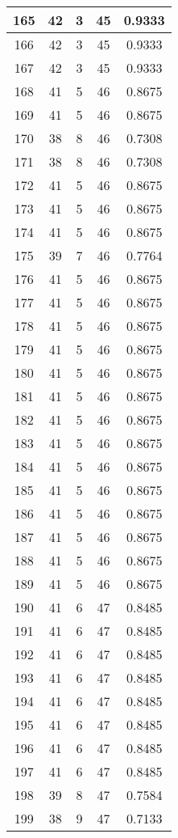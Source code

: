 \documentclass[letterpaper, 12pt]{article}
\begin{document}
\begin{longtable}{|c|c|c|c|c|}
165 & 42 & 3 & 45 & 0.9333 \\
\hline
166 & 42 & 3 & 45 & 0.9333 \\
\hline
167 & 42 & 3 & 45 & 0.9333 \\
\hline
168 & 41 & 5 & 46 & 0.8675 \\
\hline
169 & 41 & 5 & 46 & 0.8675 \\
\hline
170 & 38 & 8 & 46 & 0.7308 \\
\hline
171 & 38 & 8 & 46 & 0.7308 \\
\hline
172 & 41 & 5 & 46 & 0.8675 \\
\hline
173 & 41 & 5 & 46 & 0.8675 \\
\hline
174 & 41 & 5 & 46 & 0.8675 \\
\hline
175 & 39 & 7 & 46 & 0.7764 \\
\hline
176 & 41 & 5 & 46 & 0.8675 \\
\hline
177 & 41 & 5 & 46 & 0.8675 \\
\hline
178 & 41 & 5 & 46 & 0.8675 \\
\hline
179 & 41 & 5 & 46 & 0.8675 \\
\hline
180 & 41 & 5 & 46 & 0.8675 \\
\hline
181 & 41 & 5 & 46 & 0.8675 \\
\hline
182 & 41 & 5 & 46 & 0.8675 \\
\hline
183 & 41 & 5 & 46 & 0.8675 \\
\hline
184 & 41 & 5 & 46 & 0.8675 \\
\hline
185 & 41 & 5 & 46 & 0.8675 \\
\hline
186 & 41 & 5 & 46 & 0.8675 \\
\hline
187 & 41 & 5 & 46 & 0.8675 \\
\hline
188 & 41 & 5 & 46 & 0.8675 \\
\hline
189 & 41 & 5 & 46 & 0.8675 \\
\hline
190 & 41 & 6 & 47 & 0.8485 \\
\hline
191 & 41 & 6 & 47 & 0.8485 \\
\hline
192 & 41 & 6 & 47 & 0.8485 \\
\hline
193 & 41 & 6 & 47 & 0.8485 \\
\hline
194 & 41 & 6 & 47 & 0.8485 \\
\hline
195 & 41 & 6 & 47 & 0.8485 \\
\hline
196 & 41 & 6 & 47 & 0.8485 \\
\hline
197 & 41 & 6 & 47 & 0.8485 \\
\hline
198 & 39 & 8 & 47 & 0.7584 \\
\hline
199 & 38 & 9 & 47 & 0.7133 \\
\hline
\end{longtable}
\end{document}
